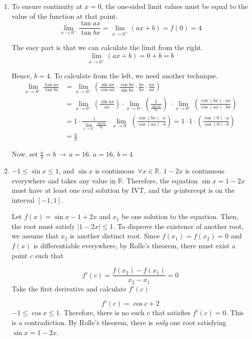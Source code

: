 \documentclass[a4paper, 12pt]{article}
\begin{document}
\begin{enumerate}[leftmargin=*,label=\textbf{\arabic*.}]
We found out that $\ln(L) = 0$. Therefore, $\boxed{L = 1}$.

\item To ensure continuity at $x=0$, the one-sided limit values must be equal to the value of the function at that point.
\[\lim_{x\to0^-}\frac{\tan ax}{\tan bx}=\lim_{x\to0^+}(ax+b)=f(0)=4\]

The easy part is that we can calculate the limit from the right.
\[\lim_{x\to0^+} (ax+b) = 0+b = b\]

Hence, $b=4$. To calculate from the left, we need another technique.
\begin{align*}
\lim_{x\to0^-} \frac{\tan ax}{\tan bx} &= \lim_{x\to0^-} \left(\frac{\sin ax}{\cos ax} \cdot \frac{\cos bx}{\sin bx} \cdot \frac{bx}{bx}\cdot \frac{ax}{ax}\right)\\[1em]&=\lim_{x\to0^-} \left(\frac{\sin ax}{ax} \right)\cdot \lim_{x\to0^-} \left(\frac1{ \frac{\sin bx}{bx}}\right)\ \cdot \lim_{x\to0^-} \left(\frac{\cos (bx) \cdot ax}{\cos(ax) \cdot bx}\right)\\[1em]&=1\cdot  \frac1{\displaystyle \lim_{x\to0^-}\frac{\sin bx}{bx}}\cdot \lim_{x\to0^-} \left(\frac{\cos (bx) \cdot a}{\cos(ax) \cdot b}\right)= 1\cdot 1\cdot\left(\frac{\cos(0) \cdot a}{\cos(0) \cdot b}\right)\\&=\frac ab
\end{align*}

Now, set $\displaystyle \frac ab = b\,\rightarrow\, a= 16$. $\boxed{a=16,\,b=4}$

\item $-1 \leq \sin x\leq 1$, and $\sin x$ is continuous $\, \forall x\in \mathbb{R}$. $1-2x$ is continuous everywhere and takes any value in $\mathbb{R}$. Therefore, the equation $\sin x=1-2x$ must have at least one real solution by IVT, and the $y$-intercept is on the interval $[-1, 1]$.

Let $f(x) = \sin x - 1 + 2x$ and $x_1$ be one solution to the equation. Then, the root must satisfy $|1-2x| \leq 1$. To disprove the existence of another root, we assume that $x_2$ is another distinct root. Since $f(x_1) = f(x_2) = 0$ and $f(x)$ is differentiable everywhere, by Rolle's theorem, there must exist a point $c$ such that

\[f'(c)=\frac{f(x_2)-f(x_1)}{x_2-x_1}=0\]
Take the first derivative and calculate $f'(c)$

\[f'(c)=\cos c+2\]
$-1\leq\cos x\leq 1$. Therefore, there is no such c that satisfies $f'(c) = 0$. This is a contradiction. By Rolle's theorem, there is \textit{only} one root satisfying $\sin x = 1-2x$.


\end{enumerate}
\end{document}
